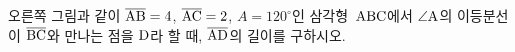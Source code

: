 \noindent\begin{minipage}[t]{0.58\linewidth}\vspace{0pt}\raggedright 오른쪽 그림과 같이 $\overline{\mathrm{AB}}=4$, $\overline{\mathrm{AC}}=2$, $A=120^\circ$인 삼각형~$\mathrm{ABC}$에서 $\angle\mathrm{A}$의 이등분선이 $\overline{\mathrm{BC}}$와 만나는 점을 $\mathrm{D}$라 할 때, $\overline{\mathrm{AD}}$의 길이를 구하시오.\end{minipage}\hfill\begin{minipage}[t]{0.4\linewidth}\vspace{0pt}\centering \resizebox{\ifdim\width>\linewidth\linewidth\else\width\fi}{!}{}\end{minipage}\par
